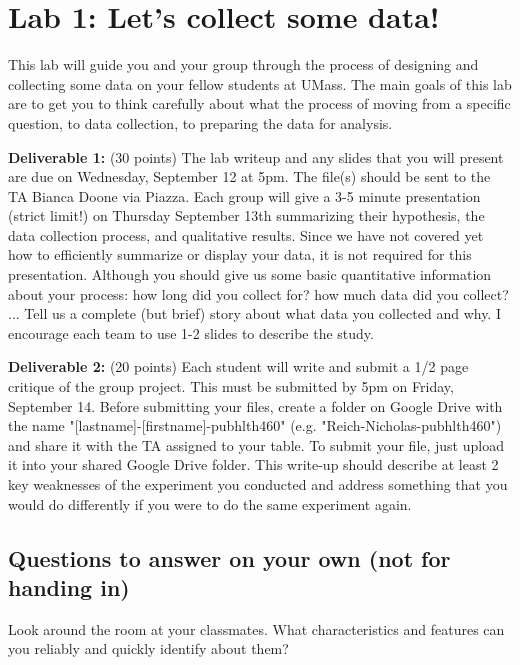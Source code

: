 \documentclass{article}\usepackage[]{graphicx}\usepackage[]{color}
\begin{document}

\section*{Lab 1: Let's collect some data!}

This lab will guide you and your group through the process of designing and collecting some data on your fellow students at UMass. The main goals of this lab are to get you to think carefully about what the process of moving from a specific question, to data collection, to preparing the data for analysis.

{\bf Deliverable 1:}
(30 points) The lab writeup and any slides that you will present are due on Wednesday, September 12 at 5pm. The file(s) should be sent to the TA Bianca Doone via Piazza. Each group will give a 3-5 minute presentation (strict limit!) on Thursday September 13th summarizing their hypothesis, the data collection process, and qualitative results. Since we have not covered yet how to efficiently summarize or display your data, it is not required for this presentation. Although you should give us some basic quantitative information about your process: how long did you collect for? how much data did you collect? ... Tell us a complete (but brief) story about what data you collected and why. I encourage each team to use 1-2 slides to describe the study.

{\bf Deliverable 2:} 
(20 points) Each student will write and submit a 1/2 page critique of the group project. This must be submitted by 5pm on Friday, September 14. Before submitting your files, create a folder on Google Drive with the name "[lastname]-[firstname]-pubhlth460" (e.g. "Reich-Nicholas-pubhlth460") and share it with the TA assigned to your table. To submit your file, just upload it into your shared Google Drive folder. This write-up should describe at least 2 key weaknesses of the experiment you conducted and address something that you would do differently if you were to do the same experiment again.

\subsection*{Questions to answer on your own (not for handing in)}

\begin{exercise}
Look around the room at your classmates. What characteristics and features can you reliably and quickly identify about them? 
\end{exercise}
\end{document}

